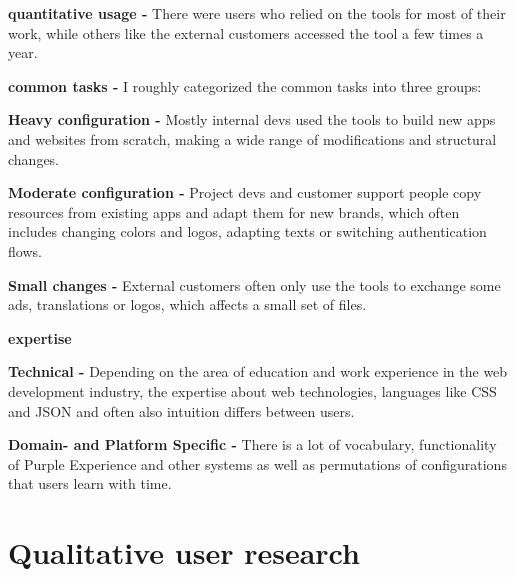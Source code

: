 \begin{description}
  \item \textbf{quantitative usage -} There were users who relied on the tools for most of their work, while others like the external customers accessed the tool a few times a year.
  \item \textbf{common tasks -} I roughly categorized the common tasks into three groups:
  \begin{description}
    \item \textbf{Heavy configuration - } Mostly internal devs used the tools to build new apps and websites from scratch, making a wide range of modifications and structural changes.
    \item \textbf{Moderate configuration -} Project devs and customer support people copy resources from existing apps and adapt them for new brands, which often includes changing colors and logos, adapting texts or switching authentication flows.
    \item \textbf{Small changes -} External customers often only use the tools to exchange some ads, translations or logos, which affects a small set of files.
  \end{description}
  \item \textbf{expertise}
  \begin{description}
    \item \textbf{Technical -} Depending on the area of education and work experience in the web development industry, the expertise about web technologies, languages like CSS and JSON and often also intuition differs between users.
    \item \textbf{Domain- and Platform Specific -} There is a lot of vocabulary, functionality of Purple Experience and other systems as well as permutations of configurations that users learn with time.
  \end{description}
\end{description}

\section{Qualitative user research}

